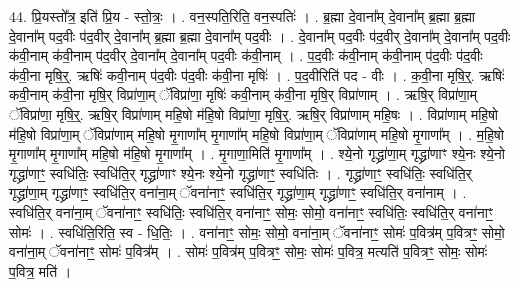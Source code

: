 \documentclass[17pt]{extarticle}
\begin{document}
44. प्रि॒यस्तो᳚त्र॒ इति॑ प्रि॒य - स्तो॒त्रः॒ । . वन॒स्पति॒रिति॒ वन॒स्पतिः॑ । . ब्र॒ह्मा दे॒वाना᳚म् दे॒वाना᳚म् ब्र॒ह्मा ब्र॒ह्मा दे॒वाना᳚म् पद॒वीः प॑द॒वीर् दे॒वाना᳚म् ब्र॒ह्मा ब्र॒ह्मा दे॒वाना᳚म् पद॒वीः । . दे॒वाना᳚म् पद॒वीः प॑द॒वीर् दे॒वाना᳚म् दे॒वाना᳚म् पद॒वीः क॑वी॒नाम् क॑वी॒नाम् प॑द॒वीर् दे॒वाना᳚म् दे॒वाना᳚म् पद॒वीः क॑वी॒नाम् । . प॒द॒वीः क॑वी॒नाम् क॑वी॒नाम् प॑द॒वीः प॑द॒वीः क॑वी॒ना मृषि॒र्॒. ऋषिः॑ कवी॒नाम् प॑द॒वीः प॑द॒वीः क॑वी॒ना मृषिः॑ । . प॒द॒वीरिति॑ पद - वीः । . क॒वी॒ना मृषि॒र्॒. ऋषिः॑ कवी॒नाम् क॑वी॒ना मृषि॒र् विप्रा॑णा॒म् ॅविप्रा॑णा॒ मृषिः॑ कवी॒नाम् क॑वी॒ना मृषि॒र् विप्रा॑णाम् । . ऋषि॒र् विप्रा॑णा॒म् ॅविप्रा॑णा॒ मृषि॒र्॒. ऋषि॒र् विप्रा॑णाम् महि॒षो म॑हि॒षो विप्रा॑णा॒ मृषि॒र्॒. ऋषि॒र् विप्रा॑णाम् महि॒षः । . विप्रा॑णाम् महि॒षो म॑हि॒षो विप्रा॑णा॒म् ॅविप्रा॑णाम् महि॒षो मृ॒गाणा᳚म् मृ॒गाणा᳚म् महि॒षो विप्रा॑णा॒म् 
ॅविप्रा॑णाम् महि॒षो मृ॒गाणा᳚म् । . म॒हि॒षो मृ॒गाणा᳚म् मृ॒गाणा᳚म् महि॒षो म॑हि॒षो मृ॒गाणा᳚म् । . मृ॒गाणा॒मिति॑ मृ॒गाणा᳚म् । . श्ये॒नो गृद्ध्रा॑णा॒म् गृद्ध्रा॑णाꣳ श्ये॒नः श्ये॒नो गृद्ध्रा॑णाꣳ॒॒ स्वधि॑तिः॒ स्वधि॑ति॒र् गृद्ध्रा॑णाꣳ 
श्ये॒नः श्ये॒नो गृद्ध्रा॑णाꣳ॒॒ स्वधि॑तिः । . गृद्ध्रा॑णाꣳ॒॒ स्वधि॑तिः॒ स्वधि॑ति॒र् गृद्ध्रा॑णा॒म् गृद्ध्रा॑णाꣳ॒॒ स्वधि॑ति॒र् वना॑ना॒म् ॅवना॑नाꣳ॒॒ 
स्वधि॑ति॒र् गृद्ध्रा॑णा॒म् गृद्ध्रा॑णाꣳ॒॒ स्वधि॑ति॒र् वना॑नाम् । . स्वधि॑ति॒र् वना॑ना॒म् ॅवना॑नाꣳ॒॒ स्वधि॑तिः॒ स्वधि॑ति॒र् वना॑नाꣳ॒॒ सोमः॒ सोमो॒ वना॑नाꣳ॒॒ स्वधि॑तिः॒ स्वधि॑ति॒र् वना॑नाꣳ॒॒ सोमः॑ । . स्वधि॑ति॒रिति॒ स्व - धि॒तिः॒ । . वना॑नाꣳ॒॒ सोमः॒ सोमो॒ वना॑ना॒म् ॅवना॑नाꣳ॒॒ सोमः॑ प॒वित्र॑म् प॒वित्रꣳ॒॒ सोमो॒ वना॑ना॒म् 
ॅवना॑नाꣳ॒॒ सोमः॑ प॒वित्र᳚म् । . सोमः॑ प॒वित्र॑म् प॒वित्रꣳ॒॒ सोमः॒ सोमः॑ प॒वित्र॒ मत्यति॑ प॒वित्रꣳ॒॒ सोमः॒ सोमः॑ प॒वित्र॒ मति॑ । \newline
\pagebreak
{}
\end{document}
